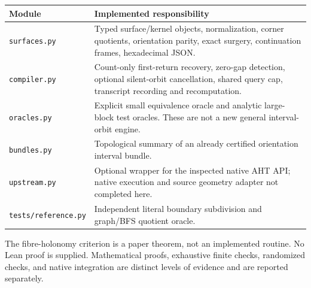 \documentclass[11pt]{article}
\theoremstyle{definition}
\theoremstyle{remark}\newtheorem{remark}[theorem]{Remark}
\newcommand{\code}[1]{\texttt{#1}}
\begin{document}
\begin{center}\small
\begin{tabularx}{\textwidth}{@{}lX@{}}\toprule
Module & Implemented responsibility\\\midrule
\code{surfaces.py} & Typed surface/kernel objects, normalization, corner quotients, orientation parity, exact surgery, continuation frames, hexadecimal JSON.\\
\code{compiler.py} & Count-only first-return recovery, zero-gap detection, optional silent-orbit cancellation, shared query cap, transcript recording and recomputation.\\
\code{oracles.py} & Explicit small equivalence oracle and analytic large-block test oracles. These are not a new general interval-orbit engine.\\
\code{bundles.py} & Topological summary of an already certified orientation interval bundle.\\
\code{upstream.py} & Optional wrapper for the inspected native AHT API; native execution and source geometry adapter not completed here.\\
\code{tests/reference.py} & Independent literal boundary subdivision and graph/BFS quotient oracle.\\\bottomrule
\end{tabularx}
\end{center}

The fibre-holonomy criterion is a paper theorem, not an implemented routine. No Lean proof is supplied. Mathematical proofs, exhaustive finite checks, randomized checks, and native integration are distinct levels of evidence and are reported separately.
\end{document}

